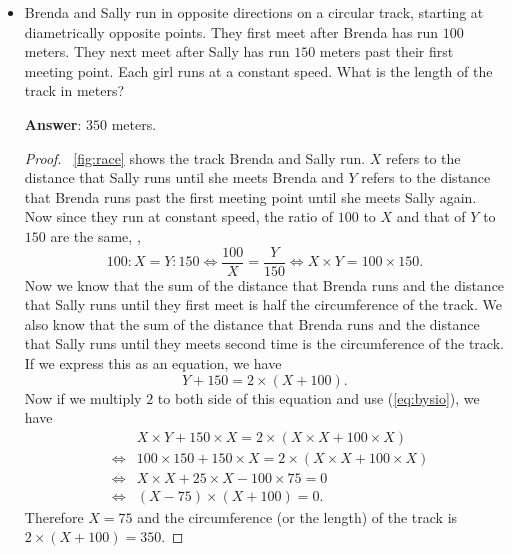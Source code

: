 \documentclass{article}
\begin{document}
\begin{itemize}
\begin{proof}
Now we subtract (\ref{eq:uydh}) from (\ref{eq:oges}), we get
\begin{equation}
x = (3\times x + 3\times y) - (2 \times x + 3 \times) = 3 \times 18 - 42 = 54 - 42 = 12.
\end{equation}
Since we initially assumed that $x$ is the number of $2$-headed dragons,
the answer is $12$.
\end{proof}


\item Brenda and Sally run in opposite directions on a circular track,
starting at diametrically opposite points.
They first meet after Brenda has run $100$ meters.
They next meet after Sally has run $150$ meters past their first meeting point.
Each girl runs at a constant speed.
What is the length of the track in meters?

{\bf Answer}: $350$ meters.

\begin{proof}
\figurename~\ref{fig:race} shows the track Brenda and Sally run.
$X$ refers to the distance that Sally runs until she meets Brenda
and $Y$ refers to the distance that Brenda runs past the first meeting point until she meets Sally again.
Now since they run at constant speed,
the ratio of $100$ to $X$ and that of $Y$ to $150$ are the same,
\ie,
\begin{equation}
\label{eq:bysio}
100 : X = Y : 150
\Leftrightarrow
\frac{100}{X} = \frac{Y}{150}
\Leftrightarrow
X \times Y = 100 \times 150.
\end{equation}
Now we know that the sum of the distance that Brenda runs and the distance that Sally runs until they first meet
is half the circumference of the track.
We also know that the sum of the distance that Brenda runs and the distance that Sally runs
until they meets second time is the circumference of the track.
If we express this as an equation, we have
\begin{equation}
Y + 150 = 2 \times (X + 100).
\end{equation}
Now if we multiply $2$ to both side of this equation and use (\ref{eq:bysio}),
we have
\begin{eqnarray*}
&& X \times Y + 150 \times X = 2 \times (X \times X + 100 \times X)
\\
&\Leftrightarrow&
100 \times 150 + 150 \times X = 2 \times (X \times X + 100 \times X)
\\
&\Leftrightarrow&
X\times X + 25 \times X - 100 \times 75 = 0
\\
&\Leftrightarrow&
(X - 75) \times (X + 100) = 0.
\end{eqnarray*}
Therefore $X=75$ and the circumference (or the length) of the track
is $2\times (X+100) = 350$.


\end{proof}
\end{itemize}
\end{document}

